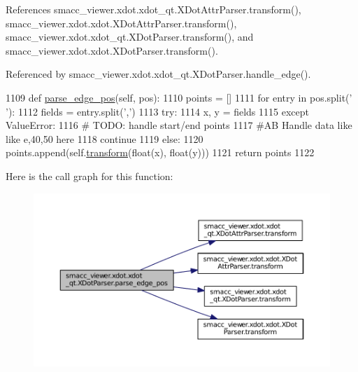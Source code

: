 References smacc\+\_\+viewer.\+xdot.\+xdot\+\_\+qt.\+X\+Dot\+Attr\+Parser.\+transform(), smacc\+\_\+viewer.\+xdot.\+xdot.\+X\+Dot\+Attr\+Parser.\+transform(), smacc\+\_\+viewer.\+xdot.\+xdot\+\_\+qt.\+X\+Dot\+Parser.\+transform(), and smacc\+\_\+viewer.\+xdot.\+xdot.\+X\+Dot\+Parser.\+transform().



Referenced by smacc\+\_\+viewer.\+xdot.\+xdot\+\_\+qt.\+X\+Dot\+Parser.\+handle\+\_\+edge().


\begin{DoxyCode}
1109     \textcolor{keyword}{def }\hyperlink{classsmacc__viewer_1_1xdot_1_1xdot__qt_1_1XDotParser_acd1d89d13fa8fdd48d7d23c8b72dd2f9}{parse\_edge\_pos}(self, pos):
1110         points = []
1111         \textcolor{keywordflow}{for} entry \textcolor{keywordflow}{in} pos.split(\textcolor{stringliteral}{' '}):
1112             fields = entry.split(\textcolor{stringliteral}{','})
1113             \textcolor{keywordflow}{try}:
1114                 x, y = fields
1115             \textcolor{keywordflow}{except} ValueError:
1116                 \textcolor{comment}{# TODO: handle start/end points}
1117                 \textcolor{comment}{#AB Handle data like like e,40,50 here}
1118                 \textcolor{keywordflow}{continue}
1119             \textcolor{keywordflow}{else}:
1120                 points.append(self.\hyperlink{classsmacc__viewer_1_1xdot_1_1xdot__qt_1_1XDotParser_ab136f7aaca27f3d01f24c816a276b929}{transform}(float(x), float(y)))
1121         \textcolor{keywordflow}{return} points
1122 
\end{DoxyCode}


Here is the call graph for this function\+:
\nopagebreak
\begin{figure}[H]
\begin{center}
\leavevmode
\includegraphics[width=350pt]{classsmacc__viewer_1_1xdot_1_1xdot__qt_1_1XDotParser_acd1d89d13fa8fdd48d7d23c8b72dd2f9_cgraph}
\end{center}
\end{figure}




